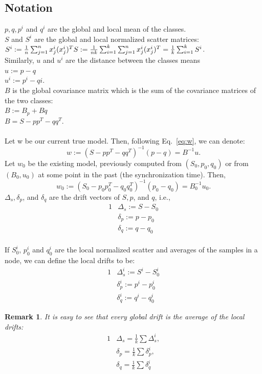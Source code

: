 \documentclass[11pt,twocolumn,varwidth=true,a4paper,fleqn]{article}
\newtheorem{remark}{Remark}
\begin{document}
\subsection{Notation}
$p,q,p^i$ and $q^i$  are the global and local mean of the classes.
\\$S$ and $S^i$  are the global and local normalized scatter matrices:
\\$S^i := \frac{1}{n}\sum_{j=1}^{n}x^i_j(x^i_j)^T
\\S := \frac{1}{nk}
\sum_{i=1}^k\sum_{j=1}^nx^i_j(x^i_j)^T=\frac{1}{k}\sum_{i=1}^kS^i$.
\\Similarly, $u$ and $u^i$ are the distance between the classes means
\\$u:=p - q$
\\$u^i:=p^i - qi$.
\\ $B$ is the global covariance matrix which is the sum of the covariance
matrices of the two classes:
\\$B:=B_p+Bq$
\\$B=S - pp^T - qq^T$.
\\\\Let w be our current true model. Then, following Eq.~\ref{eq:w}, we can
denote:
\begin{equation*}
w:=(S - pp^T - qq^T)^{-1}(p-q)=B^{-1}u.
\end{equation*}
Let $w_0$ be the existing model, previously computed from $(S_0, p_0, q_0)$
or from $(B_0,u_0)$ at some point in the past (the synchronization time).
Then,
\begin{equation*} 
w_0:=(S_0 - p_0p_0^T - q_0q_0^T)^{-1}(p_0-q_0)=B_0^{-1}u_0.
\end{equation*}
$\Delta_s, \delta_p$, and $\delta_q$ are the drift vectors of $S, p$, and $q$,
i.e.,
\begin{alignat*}{1}
& \Delta_s:= S - S_0 \\
& \delta_p:= p - p_0 \\
& \delta_q := q - q_0
\end{alignat*}
\\If $S_0^i$, $p_0^i$ and $q_0^i$ are the local normalized scatter and averages
of the samples in a node, we can define the local drifts to be:
\begin{alignat*}{1}
& \Delta_s^i:= S^i - S_0^i
\\ & \delta_p^i:= p^i - p_0^i
\\ & \delta_q^i:= q^i - q_0^i
\end{alignat*}
\begin{remark} \label{average}
It is easy to see that every global drift is the average of the local drifts:
\begin{alignat*}{1}
& \Delta_s = \frac{1}{k} \sum \Delta_s^i, \\
& \delta_p = \frac{1}{k} \sum \delta_p^i, \\
& \delta_q = \frac{1}{k} \sum \delta_q^i 
\end{alignat*}

\end{remark}
\end{document}
